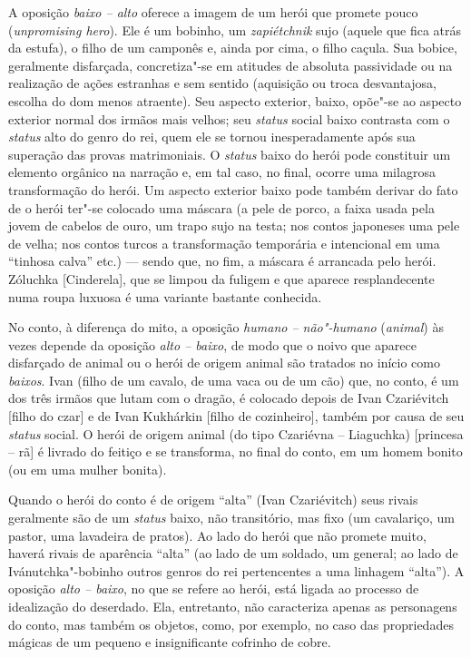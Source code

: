 {A oposição \emph{baixo -- alto} oferece a imagem de um herói que promete pouco
(\emph{unpromising hero}). Ele é um bobinho, um \emph{zapiétchnik} sujo
(aquele que fica atrás da estufa), o filho de um camponês e, ainda por
cima, o filho caçula. Sua bobice, geralmente disfarçada, concretiza"-se
em atitudes de absoluta passividade ou na realização de ações estranhas
e sem sentido (aquisição ou troca desvantajosa, escolha do dom menos
atraente). Seu aspecto exterior, baixo, opõe"-se ao aspecto exterior
normal dos irmãos mais velhos; seu \emph{status} social baixo contrasta com
o \emph{status} alto do genro do rei, quem ele se tornou inesperadamente após
sua superação das provas matrimoniais. O \emph{status} baixo do herói pode
constituir um elemento orgânico na narração e, em tal caso, no final,
ocorre uma milagrosa transformação do herói. Um aspecto exterior baixo
pode também derivar do fato de o herói ter"-se colocado uma máscara (a
pele de porco, a faixa usada pela jovem de cabelos de ouro, um trapo
sujo na testa; nos contos japoneses uma pele de velha; nos contos turcos
a transformação temporária e intencional em uma ``tinhosa calva'' etc.)
--- sendo que, no fim, a máscara é arrancada pelo herói. Zóluchka
[Cinderela], que se limpou da fuligem e que aparece resplandecente
numa roupa luxuosa é uma variante bastante conhecida.

No conto, à diferença do mito, a oposição \emph{humano --
não"-humano} (\emph{animal}) às vezes depende da oposição \emph{alto -- baixo}, de
modo que o noivo que aparece disfarçado de animal ou o herói de origem
animal são tratados no início como \emph{baixos}. Ivan (filho de um cavalo,
de uma vaca ou de um cão) que, no conto, é um dos três irmãos que lutam
com o dragão, é colocado depois de Ivan Czariévitch [filho do czar]
e de Ivan Kukhárkin [filho de cozinheiro], também por causa de
seu \emph{status} social. O herói de origem animal (do tipo Czariévna --
Liaguchka) [princesa -- rã] é livrado do feitiço e se transforma, no
final do conto, em um homem bonito (ou em uma mulher bonita).

Quando o herói do conto é de origem ``alta'' (Ivan Czariévitch) seus
rivais geralmente são de um \emph{status} baixo, não transitório, mas fixo
(um cavalariço, um pastor, uma lavadeira de pratos). Ao lado do herói
que não promete muito, haverá rivais de aparência ``alta'' (ao lado de
um soldado, um general; ao lado de Ivánutchka"-bobinho outros genros do
rei pertencentes a uma linhagem ``alta''). A oposição \emph{alto -- baixo}, no
que se refere ao herói, está ligada ao processo de idealização do
deserdado. Ela, entretanto, não caracteriza apenas as personagens do
conto, mas também os objetos, como, por exemplo, no caso das
propriedades mágicas de um pequeno e insignificante cofrinho de cobre.

}
